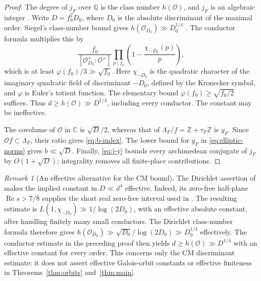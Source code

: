 \documentclass[11pt,a4paper]{article}
\numberwithin{equation}{section}
\theoremstyle{definition}
\theoremstyle{remark}
\newtheorem{remark}[theorem]{Remark}
\newcommand{\Q}{\mathbb Q}
\newcommand{\Z}{\mathbb Z}
\newcommand{\C}{\mathbb C}
\begin{document}
\begin{proof}
The degree of \(j_F\) over \(\Q\) is the class number \(h(\mathcal O)\),
and \(j_F\) is an algebraic integer \cite[Theorem~11.1 and Proposition~13.2]{Cox}.
Write \(D=f_0^2D_0\), where \(D_0\) is the absolute discriminant of
the maximal order. Siegel's class-number bound gives
\(h(\mathcal O_{D_0})\gg D_0^{1/4}\) \cite{Siegel}.
The conductor formula \cite[Theorem~7.24]{Cox} multiplies this by
\[
 \frac{f_0}{[\mathcal O_{D_0}^{\times}:\mathcal O^\times]}
 \prod_{p\mid f_0}\left(1-\frac{\chi_{-D_0}(p)}p\right),
\]
which is at least \(\varphi(f_0)/3\gg\sqrt{f_0}\).
Here \(\chi_{-D_0}\) is the quadratic character of the imaginary
quadratic field of discriminant \(-D_0\), defined by the Kronecker
symbol, and \(\varphi\) is Euler's totient function. The elementary bound
\(\varphi(f_0)\ge\sqrt{f_0/2}\) suffices.
Thus \(d\ge h(\mathcal O)\gg D^{1/4}\), including every conductor.
The constant may be ineffective.

The covolume of \(\mathcal O\) in \(\C\) is \(\sqrt D/2\), whereas
that of \(\Lambda_F/f=\Z+\tau_F\Z\) is \(y_F\). Since
\(\mathcal O f\subset\Lambda_F\), their ratio gives
\eqref{eq:b-index}. The lower bound for \(y_F\) in
\eqref{eq:elliptic-norms} gives \(b\ll\sqrt D\).
Finally, \eqref{eq:j-y} bounds every archimedean conjugate of \(j_F\)
by \(O(1+\sqrt D)\); integrality removes all finite-place contributions.
\end{proof}

\begin{remark}[An effective alternative for the CM bound]
\label{rem:effective-cm}
The Dirichlet assertion of \cite[Theorem~1.1]{OpenAIQuasiRH2026}
makes the implied constant in \(D\ll d^4\) effective. Indeed, its
zero-free half-plane \(\operatorname{Re}s>7/8\) supplies the short real
zero-free interval used in
\cite[proof of Theorem~2, pp.~363--364]{Chen2007}. The resulting estimate is
\(L(1,\chi_{-D_0})\gg1/\log(2D_0)\), with an effective absolute
constant, after handling finitely many small conductors. The Dirichlet
class-number formula therefore gives
\(h(\mathcal O_{D_0})\gg\sqrt{D_0}/\log(2D_0)\gg D_0^{1/4}\)
effectively. The conductor estimate in the preceding proof then yields
\(d\ge h(\mathcal O)\gg D^{1/4}\) with an effective constant for
every order. This concerns only the CM discriminant estimate: it does
not assert effective Galois-orbit constants or effective finiteness in
Theorems~\ref{thm:orbits} and~\ref{thm:main}.
\end{remark}
\end{document}
